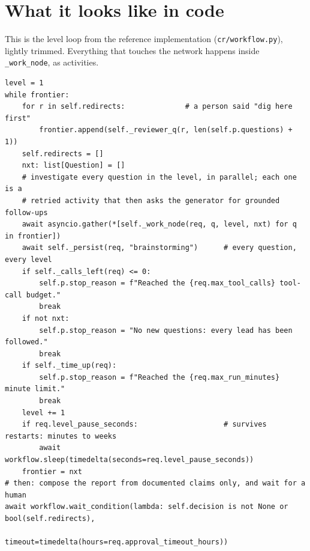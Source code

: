 \documentclass[11pt]{article}
\begin{document}
\section*{What it looks like in code}
This is the level loop from the reference implementation (\texttt{cr/workflow.py}), lightly trimmed. Everything that touches the network happens inside \texttt{\_work\_node}, as activities.
\begin{lstlisting}
level = 1
while frontier:
    for r in self.redirects:              # a person said "dig here first"
        frontier.append(self._reviewer_q(r, len(self.p.questions) + 1))
    self.redirects = []
    nxt: list[Question] = []
    # investigate every question in the level, in parallel; each one is a
    # retried activity that then asks the generator for grounded follow-ups
    await asyncio.gather(*[self._work_node(req, q, level, nxt) for q in frontier])
    await self._persist(req, "brainstorming")      # every question, every level
    if self._calls_left(req) <= 0:
        self.p.stop_reason = f"Reached the {req.max_tool_calls} tool-call budget."
        break
    if not nxt:
        self.p.stop_reason = "No new questions: every lead has been followed."
        break
    if self._time_up(req):
        self.p.stop_reason = f"Reached the {req.max_run_minutes} minute limit."
        break
    level += 1
    if req.level_pause_seconds:                    # survives restarts: minutes to weeks
        await workflow.sleep(timedelta(seconds=req.level_pause_seconds))
    frontier = nxt
# then: compose the report from documented claims only, and wait for a human
await workflow.wait_condition(lambda: self.decision is not None or bool(self.redirects),
                              timeout=timedelta(hours=req.approval_timeout_hours))
\end{lstlisting}
\end{document}
